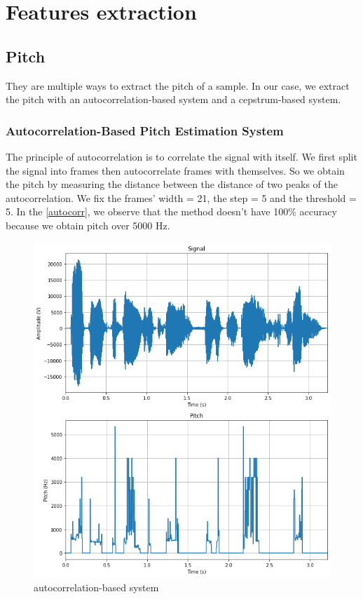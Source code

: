 \documentclass[]{article}
\begin{document}
\section{Features extraction}
\subsection{Pitch}
They are multiple ways to extract the pitch of a sample. In our case, we extract the pitch with an autocorrelation-based
system and a cepstrum-based system.

\subsubsection{Autocorrelation-Based Pitch Estimation System}
The principle of autocorrelation is to correlate the signal with itself. We first split the signal into frames then autocorrelate
frames with themselves.
So we obtain the pitch by measuring the distance between the distance of two peaks of the autocorrelation. 
We fix the frames' width = 21, the step = 5 and the threshold = 5. 
In the \autoref{autocorr}, we observe that the method doesn't have 100\% accuracy because we obtain pitch over 5000 Hz.

\begin{figure}[H]
    \centering
    \caption{\label{autocorr}autocorrelation-based system}
    \includegraphics[scale=0.5]{images/autocorr_pitch.png}
\end{figure}
\end{document}

